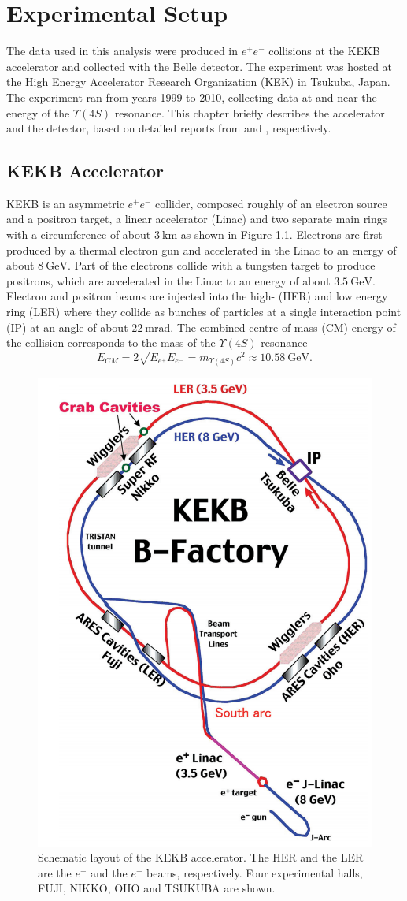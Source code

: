 \documentclass[headings=standardclasses,headings=big,oneside,a4paper,openany,12pt]{scrbook}
\newcommand {\e}[1]{\mathrm{~#1}}
\begin{document}
\chapter{Experimental Setup}
The data used in this analysis were produced in $e^+e^-$ collisions at the KEKB accelerator and collected with the Belle detector. The experiment was hosted at the High Energy Accelerator Research Organization (KEK) in Tsukuba, Japan. The experiment ran
from years 1999 to 2010, collecting data at and near the energy of the $\Upsilon(4S)$ resonance. This chapter briefly describes the accelerator and the detector, based on detailed reports from \cite{doi:10.1093/ptep/pts102} and \cite{ABASHIAN2002117}, respectively.


\section{KEKB Accelerator}
KEKB is an asymmetric $e^+e^-$ collider, composed roughly of an electron source and a positron target, a linear accelerator (Linac) and two separate main rings with a circumference of about $3\e{km}$ as shown in Figure \ref{fig:kekb}. Electrons are first produced by a thermal electron gun and accelerated in the Linac to an energy of about $8\e{GeV}$. Part of the electrons collide with a tungsten target to produce positrons, which are accelerated in the Linac to an energy of about $3.5\e{GeV}$. Electron and positron beams are injected into the high- (HER) and low energy ring (LER) where they collide as bunches of particles at a single interaction point (IP) at an angle of about $22\e{mrad}$. The combined centre-of-mass (CM) energy of the collision corresponds to the mass of the $\Upsilon(4S)$ resonance
\begin{equation}
E_{CM} = 2\sqrt{E_{e^+}E_{e^-}} = m_{\Upsilon(4S)}c^2 \approx 10.58\e{GeV}.
\end{equation}

\begin{figure}[H]
	\centering
	\captionsetup{width=0.8\linewidth}
	\includegraphics[width=0.5\linewidth]{fig/setup/KEKB}
	\caption{Schematic layout of the KEKB accelerator. The HER and the LER are the $e^-$ and the $e^+$ beams, respectively. Four experimental halls, FUJI, NIKKO, OHO and TSUKUBA are shown.}
	\label{fig:kekb}
\end{figure}
\end{document}
